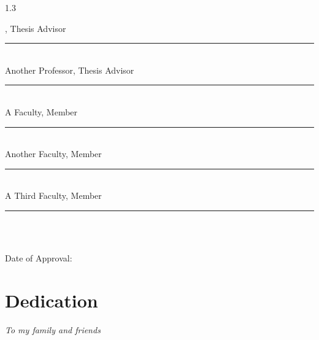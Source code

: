 \begin{spacing}{1.3}
  \begin{flushright}	
  \rightskip=1.1cm  %
  \supervisorEn, Thesis Advisor 		\hspace{1.5cm}\rule{10em}{0.4pt}\\[1.1\baselineskip] 	
  Another Professor, Thesis Advisor 	\hspace{1.5cm}\rule{10em}{0.4pt}\\[1.1\baselineskip] 	
  A Faculty, Member 					\hspace{1.5cm}\rule{10em}{0.4pt}\\[1.1\baselineskip] 	
  Another Faculty, Member 			\hspace{1.5cm}\rule{10em}{0.4pt}\\[1.1\baselineskip] 	
  A Third Faculty, Member 			\hspace{1.5cm}\rule{10em}{0.4pt}\\[1.1\baselineskip]	
  \end{flushright}

  \vfill

  \begin{center} 
    \textbf{\university} \\ Date of Approval: \approvaldate
  \end{center}
  \vspace{1.3cm}

\end{spacing}

\vspace*{-50pt}         %
\chapter*{Dedication}   %

\thispagestyle{empty}
\vspace*{\fill}
\begin{center}
    \textit{To my family and friends}
\end{center}
\vspace*{\fill} 

